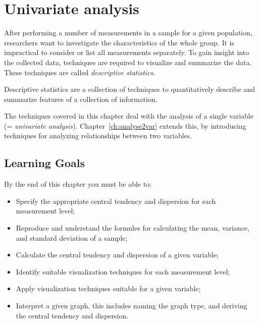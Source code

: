 \chapter{Univariate analysis}
\label{ch:univariate-analysis}

After performing a number of measurements in a sample for a given population, researchers want to investigate the characteristics of the whole group. It is impractical to consider or list all measurements separately. To gain insight into the collected data, techniques are required to visualize and summarize the data. These techniques are called \emph{descriptive statistics}.


\begin{definition}
  Descriptive statistics are a collection of techniques to quantitatively describe and summarize features of a collection of information.
\end{definition}

The techniques covered in this chapter deal with the analysis of a single variable (= \emph{univariate analysis}). Chapter~\ref{ch:analyse2var} extends this, by introducing techniques for analyzing relationships between two variables.

\section{Learning Goals}
\label{sec:analyse1var-leerdoelen}

By the end of this chapter you must be able to:

\begin{itemize}
    \item Specify the appropriate central tendency and dispersion for each measurement level;
    \item Reproduce and understand the formules for calculating the mean, variance, and standard deviation of a sample;
    \item Calculate the central tendency and dispersion of a given variable;
    \item Identify suitable visualization techniques for each measurement level;
    \item Apply visualization techniques suitable for a given variable;
    \item Interpret a given graph, this includes naming the graph type, and deriving the central tendency and dispersion.
\end{itemize}

